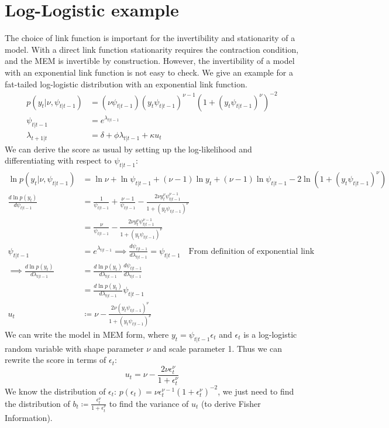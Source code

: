 \documentclass[DIV=14,titlepage=false]{scrreprt}
\begin{document}
\section{Log-Logistic example}
The choice of link function is important for the invertibility and stationarity of a model. With a direct link function stationarity requires the contraction condition, and the MEM is invertible by construction. However, the invertibility of a model with an exponential link function is not easy to check. We give an example for a fat-tailed log-logistic distribution with an exponential link function.
\begin{align*}
    p(y_t|\nu, \psi_{t|t-1}) &= (\nu \psi_{t|t-1})(y_t\psi_{t|t-1})^{\nu-1}(1+(y_t\psi_{t|t-1})^\nu)^{-2}\\
    \psi_{t|t-1} &= e^{\lambda_{t|t-1}}\\
    \lambda_{t+1|t} &= \delta + \phi \lambda_{t|t-1} + \kappa u_t
\end{align*}
We can derive the score as usual by setting up the log-likelihood and differentiating with respect to $\psi_{t|t-1}$:
\begin{align*}
    \ln p(y_t|\nu, \psi_{t|t-1})&=\ln \nu + \ln \psi_{t|t-1} + (\nu-1)\ln y_t + (\nu-1)\ln \psi_{t|t-1}-2\ln (1+(y_t\psi_{t|t-1})^\nu)\\
    \frac{d \ln p(y_t)}{d\psi_{t|t-1}} &= \frac{1}{\psi_{t|t-1}} + \frac{\nu -1}{\psi_{t|t-1}} -\frac{2\nu y_t^\nu \psi_{t|t-1}^{\nu-1}}{1+(y_t\psi_{t|t-1})^\nu}\\
    &= \frac{\nu}{\psi_{t|t-1}} -\frac{2\nu y_t^\nu \psi_{t|t-1}^{\nu-1}}{1+(y_t\psi_{t|t-1})^\nu}\\
    \psi_{t|t-1} &= e^{\lambda_{t|t-1}} \implies \frac{d\psi_{t|t-1}}{d\lambda_{t|t-1}} = \psi_{t|t-1}\quad \text{From definition of exponential link}\\
    \implies \frac{d \ln p(y_t)}{d\lambda_{t|t-1}} &= \frac{d \ln p(y_t)}{d\lambda_{t|t-1}} \frac{d\psi_{t|t-1}}{d\lambda_{t|t-1}}\\
     &= \frac{d \ln p(y_t)}{d\lambda_{t|t-1}} \psi_{t|t-1}\\
    u_t &\coloneq \nu - \frac{2\nu (y_t \psi_{t|t-1})^{\nu}}{1+(y_t\psi_{t|t-1})^\nu}
\end{align*}
We can write the model in MEM form, where $y_t = \psi_{t|t-1} \epsilon_t$ and $\epsilon_t$ is a log-logistic random variable with shape parameter $\nu$ and scale parameter 1. Thus we can rewrite the score in terms of $\epsilon_t$:
\[
    u_t = \nu - \frac{2\nu \epsilon_t^{\nu}}{1+\epsilon_t^\nu}
\]
We know the distribution of $\epsilon_t$: $p(\epsilon_t)= \nu \epsilon_t^{\nu-1}(1+\epsilon_t^\nu)^{-2}$, we just need to find the distribution of $b_t \coloneq \frac{ \epsilon_t^{\nu}}{1+\epsilon_t^\nu}$ to find the variance of $u_t$ (to derive Fisher Information).
\end{document}
